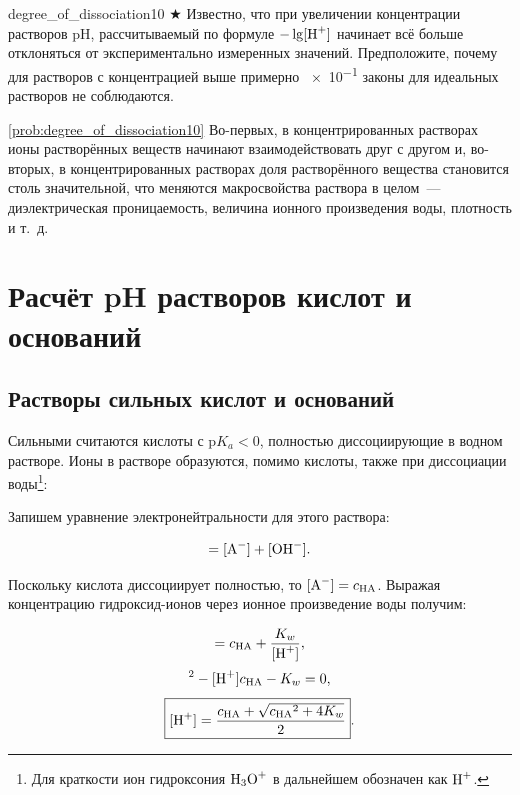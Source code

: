 \begin{problem}{}{degree_of_dissociation10}
    $\bigstar$ Известно, что при увеличении концентрации растворов pH, рассчитываемый по формуле $-\lg[\ce{H+}]$ начинает всё больше отклоняться от экспериментально измеренных значений. Предположите, почему для растворов с концентрацией выше примерно \qty{e-1}{\ruMolar} законы для идеальных растворов не соблюдаются.
    \begin{sol}{\ref{prob:degree_of_dissociation10}}
        Во-первых, в концентрированных растворах ионы растворённых веществ начинают взаимодействовать друг с другом и, во-вторых, в концентрированных растворах доля растворённого вещества становится столь значительной, что меняются макросвойства раствора в целом~--- диэлектрическая проницаемость, величина ионного произведения воды, плотность и т.~д.
    \end{sol}
\end{problem}

\clearpage

\section{Расчёт pH растворов кислот и оснований}

\subsection*{Растворы сильных кислот и оснований}

Сильными считаются кислоты с $\text{p}K_a < 0$, полностью диссоциирующие в водном растворе. Ионы  в растворе образуются, помимо кислоты, также при диссоциации воды\footnote{Для краткости ион гидроксония $\ce{H3O^+}$ в дальнейшем обозначен как $\ce{H^+}$.}:


Запишем уравнение электронейтральности для этого раствора:

\begin{equation*}
    [\ce{H^+}] = [\ce{A^-}] + [\ce{OH^-}].
\end{equation*}

Поскольку кислота диссоциирует полностью, то $[\ce{A^-}] = c_{\text{HA}}$. Выражая концентрацию гидроксид-ионов через ионное произведение воды получим:

\begin{equation*}
    [\ce{H^+}] = c_{\text{HA}} + \frac{K_w}{[\ce{H^+}]},
\end{equation*}
\begin{equation*}
    [\ce{H^+}]^2 - [\ce{H^+}]c_{\text{HA}} - K_w = 0,
\end{equation*}
\begin{equation}
    \label{eq:strong_acid_solution}
    \boxed{[\ce{H^+}] = \frac{c_{\text{HA}} + \sqrt{{c_{\text{HA}}}^2 + 4K_w}}{2}}.
\end{equation}

